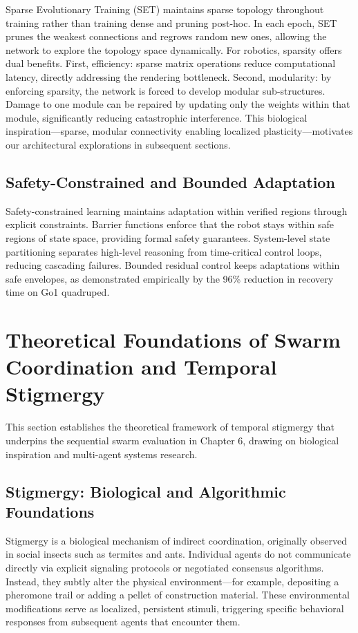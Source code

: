 \documentclass[12pt,a4paper,oneside]{report}
\begin{document}
Sparse Evolutionary Training (SET) maintains sparse topology throughout training rather than training dense and pruning post-hoc. In each epoch, SET prunes the weakest connections and regrows random new ones, allowing the network to explore the topology space dynamically. For robotics, sparsity offers dual benefits. First, efficiency: sparse matrix operations reduce computational latency, directly addressing the rendering bottleneck. Second, modularity: by enforcing sparsity, the network is forced to develop modular sub-structures. Damage to one module can be repaired by updating only the weights within that module, significantly reducing catastrophic interference. This biological inspiration---sparse, modular connectivity enabling localized plasticity---motivates our architectural explorations in subsequent sections.

\subsection{Safety-Constrained and Bounded Adaptation}

Safety-constrained learning maintains adaptation within verified regions through explicit constraints. Barrier functions enforce that the robot stays within safe regions of state space, providing formal safety guarantees. System-level state partitioning separates high-level reasoning from time-critical control loops, reducing cascading failures. Bounded residual control keeps adaptations within safe envelopes, as demonstrated empirically by the 96\% reduction in recovery time on Go1 quadruped.

\section{Theoretical Foundations of Swarm Coordination and Temporal Stigmergy}

This section establishes the theoretical framework of temporal stigmergy that underpins the sequential swarm evaluation in Chapter 6, drawing on biological inspiration and multi-agent systems research.

\subsection{Stigmergy: Biological and Algorithmic Foundations}

Stigmergy is a biological mechanism of indirect coordination, originally observed in social insects such as termites and ants. Individual agents do not communicate directly via explicit signaling protocols or negotiated consensus algorithms. Instead, they subtly alter the physical environment---for example, depositing a pheromone trail or adding a pellet of construction material. These environmental modifications serve as localized, persistent stimuli, triggering specific behavioral responses from subsequent agents that encounter them.
\end{document}
